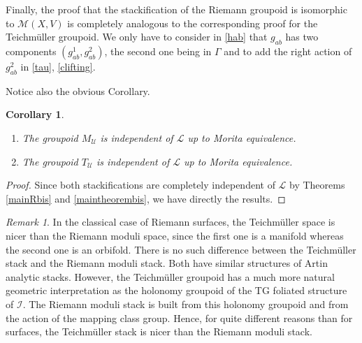 \documentclass[JEP,XML,SOM,Unicode]{cedram}
\let\mathcal\mathscr
\theoremstyle{plain}
\newtheorem{corollary}[theorem]{Corollary}
\theoremstyle{definition}
\theoremstyle{remark}
\newtheorem{remark}[theorem]{Remark}
\numberwithin{equation}{section}
\newcommand{\cI}{\mathcal{I}}
\begin{document}
Finally, the proof that the stackification of the Riemann groupoid is isomorphic to $\mathcal M(X,V)$ is completely analogous to the corresponding proof for the Teichmüller groupoid. We only have to consider in \eqref{hab} that $g_{ab}$ has two components $(g^1_{ab},g^2_{ab})$, the second one being in $\Gamma$ and to add the right action of $g^2_{ab}$ in \eqref{tau}, \eqref{clifting}.

Notice also the obvious Corollary.

\skpt
\begin{corollary}
\label{Lindep}
\begin{enumerate}
\item
The groupoid $M_{\mathcal U}$ is independent of $\mathcal L$ up to Morita equivalence.
\item
The groupoid $T_{\mathcal U}$ is independent of $\mathcal L$ up to Morita equivalence.
\end{enumerate}
\end{corollary}

\begin{proof}
Since both stackifications are completely independent of $\mathcal L$ by Theorems \ref{mainRbis} and \ref{maintheorembis}, we have directly the results.
\end{proof}

\begin{remark}
\label{RvsT}
In the classical case of Riemann surfaces, the Teichmüller space is nicer than the Riemann moduli space, since the first one is a manifold whereas the second one is an orbifold. There is no such difference between the Teichmüller stack and the Riemann moduli stack. Both have similar structures of Artin analytic stacks. However, the Teichmüller groupoid has a much more natural geometric interpretation as the holonomy groupoid of the TG foliated structure of $\cI$. The Riemann moduli stack is built from this holonomy groupoid and from the action of the mapping class group. Hence, for quite different reasons than for surfaces, the Teichmüller stack is nicer than the Riemann moduli stack.
\end{remark}
\end{document}
